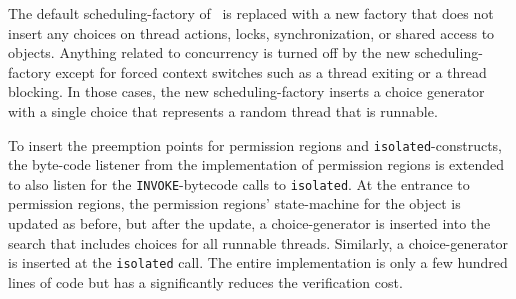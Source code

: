 The default scheduling-factory of \jpf\ is replaced with a new factory that
does not insert any choices on thread actions, locks, synchronization,
or shared access to objects. Anything related to concurrency is turned
off by the new scheduling-factory except for forced context switches
such as a thread exiting or a thread blocking. In those cases, the new
scheduling-factory inserts a choice generator with a single choice that
represents a random thread that is runnable.

To insert the preemption points for permission regions and
\texttt{isolated}-constructs, the byte-code listener from the
implementation of permission regions is extended to also listen for
the \texttt{INVOKE}-bytecode calls to \texttt{isolated}. At the
entrance to permission regions, the permission regions' state-machine for the
object is updated as before, but after the update, a choice-generator
is inserted into the search that includes choices for all runnable
threads. Similarly, a choice-generator is inserted at the
\texttt{isolated} call. The entire implementation is only a few
hundred lines of code but has a significantly reduces the verification
cost.
